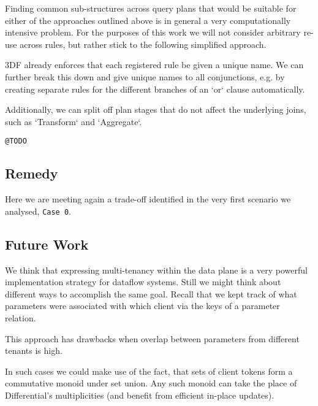 \documentclass[../catalog.tex]{subfiles}
\begin{document}
Finding common sub-structures across query plans that would be
suitable for either of the approaches outlined above is in general a
very computationally intensive problem. For the purposes of this work
we will not consider arbitrary re-use across rules, but rather stick
to the following simplified approach.

3DF already enforces that each registered rule be given a unique
name. We can further break this down and give unique names to all
conjunctions, e.g. by creating separate rules for the different
branches of an `or` clause automatically.

Additionally, we can split off plan stages that do not affect the
underlying joins, such as `Transform` and `Aggregate`.

\texttt{@TODO}

\subsection{Remedy}

Here we are meeting again a trade-off identified in the very first
scenario we analysed, \texttt{Case 0}.

\subsection{Future Work}

We think that expressing multi-tenancy within the data plane is a very
powerful implementation strategy for dataflow systems. Still we might
think about different ways to accomplish the same goal. Recall that we
kept track of what parameters were associated with which client via
the keys of a parameter relation.

This approach has drawbacks when overlap between parameters from
different tenants is high.

In such cases we could make use of the fact, that sets of client
tokens form a commutative monoid under set union. Any such monoid can
take the place of Differential's multiplicities (and benefit from
efficient in-place updates).
\end{document}
